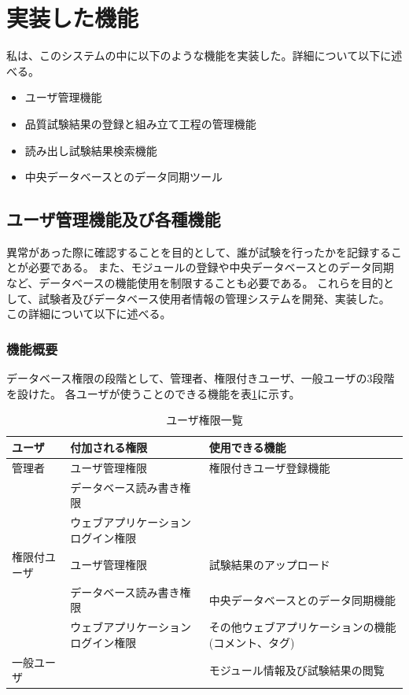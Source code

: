 \section{実装した機能}
私は、このシステムの中に以下のような機能を実装した。詳細について以下に述べる。
\begin{itemize}
  \item ユーザ管理機能
  \item 品質試験結果の登録と組み立て工程の管理機能
  \item 読み出し試験結果検索機能
  \item 中央データベースとのデータ同期ツール
\end{itemize}

\subsection{ユーザ管理機能及び各種機能}

異常があった際に確認することを目的として、誰が試験を行ったかを記録することが必要である。
また、モジュールの登録や中央データベースとのデータ同期など、データベースの機能使用を制限することも必要である。
これらを目的として、試験者及びデータベース使用者情報の管理システムを開発、実装した。
この詳細について以下に述べる。

\subsubsection{機能概要}
データベース権限の段階として、管理者、権限付きユーザ、一般ユーザの3段階を設けた。
各ユーザが使うことのできる機能を表\ref{user_functions_summary}に示す。

\begin{table}[tbp]
\begin{center}
\caption[ユーザ権限一覧]{ユーザ権限一覧}
\label{user_functions_summary}
  \begin{tabular}{|lll|} \hline
    ユーザ       & 付加される権限                               & 使用できる機能 \\ \hline
    管理者       & ユーザ管理権限                     & 権限付きユーザ登録機能\\ 
                 & データベース読み書き権限           & \\ 
                 & ウェブアプリケーションログイン権限 & \\ \hline
    権限付ユーザ & ユーザ管理権限                     & 試験結果のアップロード\\ 
                 & データベース読み書き権限           & 中央データベースとのデータ同期機能\\ 
                 & ウェブアプリケーションログイン権限 & その他ウェブアプリケーションの機能(コメント、タグ)\\ \hline
    一般ユーザ   &                                    & モジュール情報及び試験結果の閲覧　\\ \hline
  \end{tabular}
\end{center}
\end{table}

